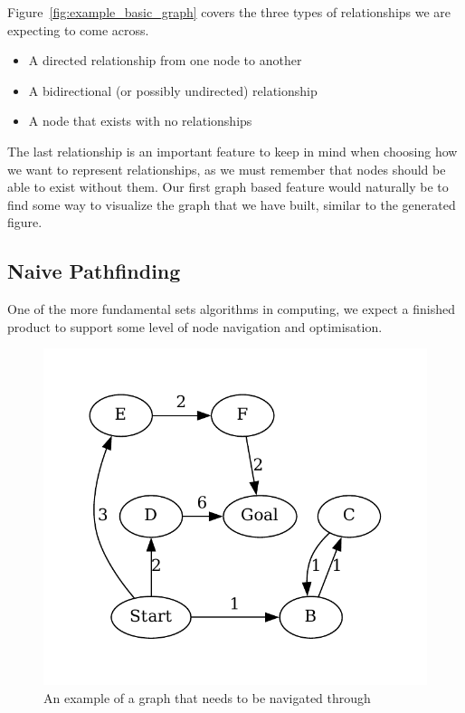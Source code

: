 Figure~\ref{fig:example_basic_graph} covers the three types of relationships we are expecting to come across.
\begin{itemize}
    \item A directed relationship from one node to another
    \item A bidirectional (or possibly undirected) relationship
    \item A node that exists with no relationships
\end{itemize}
The last relationship is an important feature to keep in mind when choosing how we want to represent relationships, as
we must remember that nodes should be able to exist without them.
Our first graph based feature would naturally be to find some way to visualize the graph that we have built, similar to
the generated figure.

\subsection{Naive Pathfinding}\label{subsec:naive-pathfinding}
One of the more fundamental sets algorithms in computing, we expect a finished product to support some level of node
navigation and optimisation.

\begin{figure}[H]
    \centering
    \includegraphics[width=12cm]{figures/example_graphs/pathfinding.gv}
    \caption{An example of a graph that needs to be navigated through}
    \label{fig:example_pathfinding_graph}
\end{figure}

